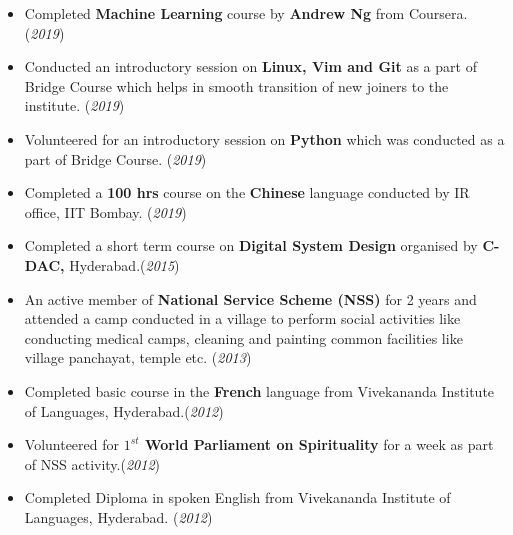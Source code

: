 \documentclass[10pt]{article}
\begin{document}
\begin{itemize}
	\item {Completed \textbf{Machine Learning} course by \textbf{Andrew Ng} from Coursera. }\hfill{(\textit{2019})}
	\item {Conducted an introductory session on \textbf{Linux, Vim and Git} as a part of Bridge Course which helps in smooth transition of new joiners to the institute. }\hfill{(\textit{2019})}
	\item {Volunteered for an introductory session on \textbf{Python} which was conducted as a part of Bridge Course.}
	\hfill{(\textit{2019})}
    \item {Completed a \textbf{100 hrs} course on the \textbf{Chinese} language conducted by IR office, IIT Bombay. }\hfill{(\textit{2019})}
    \item {Completed a short term course on \textbf{Digital System Design} organised by \textbf{C-DAC,} Hyderabad.}\hfill{(\textit{2015})}
	\item {An active member of \textbf{National Service Scheme (NSS)} for 2 years and attended a camp conducted in a village to perform social activities like conducting medical camps, cleaning and painting common facilities like village panchayat, temple etc.} \hfill{(\textit{2013})}
     \item {Completed basic course in the \textbf{French} language from Vivekananda Institute of Languages, Hyderabad.}\hfill{(\textit{2012})}
   	\item {Volunteered for \textbf{$1^{st}$ World Parliament on Spirituality} for a week as part of NSS activity.}\hfill{(\textit{2012})}
	\item {Completed Diploma in spoken English from Vivekananda Institute of Languages, Hyderabad.} \hfill{(\textit{2012})}
    
    
\end{itemize}

\end{document}
